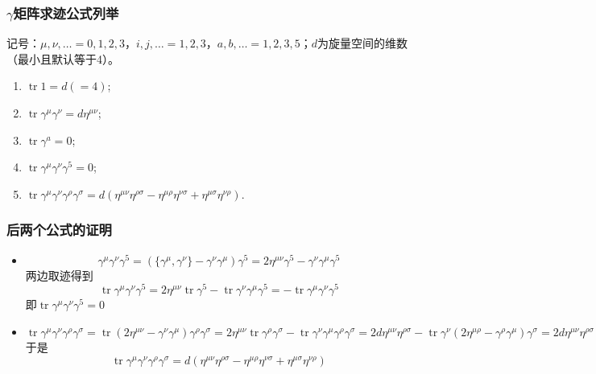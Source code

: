 \documentclass[aspectratio=1610,14pt,matheuler]{beamer}
\newcommand{\bch}{}
\newcommand{\ech}{}
\DeclareMathOperator{\tr}{tr}
\begin{document}
\begin{frame}
\frametitle{\bch $\gamma$矩阵求迹公式列举 \ech}
\bch
记号：$\mu,\nu,\dots=0,1,2,3$，$i,j,\dots = 1,2,3$，$a,b,\dots = 1,2,3,5$；$d$为旋量空间的维数（最小且默认等于4）。
\begin{enumerate}
\item $\tr 1 = d (= 4)$;
\item $\tr \gamma^\mu \gamma^\nu = d\eta^{\mu \nu}$;
\item $\tr \gamma^a = 0$;
\item $\tr \gamma^\mu \gamma^\nu \gamma^5 = 0$;
\item $\tr \gamma^\mu \gamma^\nu \gamma^\rho \gamma^\sigma = d(\eta^{\mu \nu} \eta^{\rho \sigma} - \eta^{\mu \rho} \eta^{\nu \sigma} + \eta^{\mu \sigma} \eta^{\nu \rho})$.
\end{enumerate}
\ech
\end{frame}


\begin{frame}
\frametitle{\bch 后两个公式的证明 \ech}
\bch
\begin{itemize}
\item $$ \gamma^\mu \gamma^\nu \gamma^5 =(\{\gamma^\mu,\gamma^\nu\} - \gamma^\nu \gamma^\mu) \gamma^5 = 2\eta^{\mu \nu} \gamma^5 - \gamma^\nu \gamma^\mu \gamma^5$$
两边取迹得到
$$
\tr \gamma^\mu \gamma^\nu \gamma^5 = 2\eta^{\mu \nu} \tr \gamma^5 - \tr \gamma^\nu \gamma^\mu \gamma^5 = -\tr \gamma^\mu \gamma^\nu \gamma^5
$$
即$\tr \gamma^\mu \gamma^\nu \gamma^5 =0$
\item $\tr \gamma^\mu \gamma^\nu \gamma^\rho \gamma^\sigma = \tr (2\eta^{\mu \nu} - \gamma^\nu \gamma^\mu) \gamma^\rho \gamma^\sigma = 2\eta^{\mu \nu}  \tr \gamma^\rho \gamma^\sigma  - \tr  \gamma^\nu \gamma^\mu \gamma^\rho \gamma^\sigma = 2d\eta^{\mu \nu}\eta^{\rho \sigma} - \tr \gamma^\nu ( 2\eta^{\mu \rho} - \gamma^\rho \gamma^\mu) \gamma^\sigma = 2d\eta^{\mu \nu}\eta^{\rho \sigma}  - 2d \eta^{\mu \rho}\eta^{\nu \sigma} + \tr \gamma^\nu\gamma^\rho \gamma^\mu\gamma^\sigma = 2d\eta^{\mu \nu}\eta^{\rho \sigma}  - 2d \eta^{\mu \rho}\eta^{\nu \sigma}+ \tr \gamma^\nu\gamma^\rho (2\eta^{\sigma \mu} - \gamma^\sigma \gamma^\mu) = 2d(\eta^{\mu \nu}\eta^{\rho \sigma }- \eta^{\mu \rho}\eta^{\nu \sigma} + \eta^{\sigma \mu}\eta^{\nu \rho}) - \tr \gamma^\mu \gamma^\nu \gamma^\rho \gamma^\sigma$
于是
$$\tr \gamma^\mu \gamma^\nu \gamma^\rho \gamma^\sigma = d(\eta^{\mu \nu} \eta^{\rho \sigma} - \eta^{\mu \rho} \eta^{\nu \sigma} + \eta^{\mu \sigma} \eta^{\nu \rho})$$
\end{itemize}
\ech
\end{frame}
\end{document}
